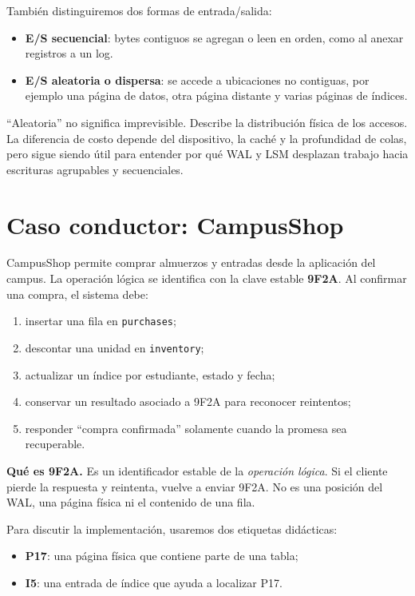 \documentclass[variant=apuntes,cover=institutional,mode=screen]{ua-engineering-v6-article}
\begin{document}
También distinguiremos dos formas de entrada/salida:

\begin{itemize}
\item \textbf{E/S secuencial}: bytes contiguos se agregan o leen en orden, como al anexar registros a un log.
\item \textbf{E/S aleatoria o dispersa}: se accede a ubicaciones no contiguas, por ejemplo una página de datos, otra página distante y varias páginas de índices.
\end{itemize}

``Aleatoria'' no significa imprevisible. Describe la distribución física de los accesos. La diferencia de costo depende del dispositivo, la caché y la profundidad de colas, pero sigue siendo útil para entender por qué WAL y LSM desplazan trabajo hacia escrituras agrupables y secuenciales.

\section{Caso conductor: CampusShop}

CampusShop permite comprar almuerzos y entradas desde la aplicación del campus. La operación lógica se identifica con la clave estable \textbf{9F2A}. Al confirmar una compra, el sistema debe:

\begin{enumerate}
\item insertar una fila en \texttt{purchases};
\item descontar una unidad en \texttt{inventory};
\item actualizar un índice por estudiante, estado y fecha;
\item conservar un resultado asociado a 9F2A para reconocer reintentos;
\item responder ``compra confirmada'' solamente cuando la promesa sea recuperable.
\end{enumerate}

\begin{uainfo}
\textbf{Qué es 9F2A.} Es un identificador estable de la \emph{operación lógica}. Si el cliente pierde la respuesta y reintenta, vuelve a enviar 9F2A. No es una posición del WAL, una página física ni el contenido de una fila.
\end{uainfo}

Para discutir la implementación, usaremos dos etiquetas didácticas:

\begin{itemize}
\item \textbf{P17}: una página física que contiene parte de una tabla;
\item \textbf{I5}: una entrada de índice que ayuda a localizar P17.
\end{itemize}
\end{document}
